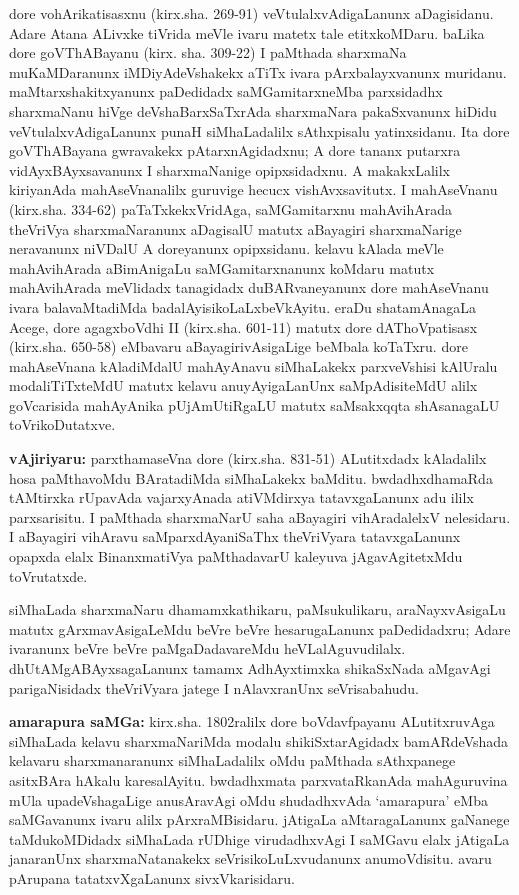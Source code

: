 dore vohArikatisasxnu (kirx.sha. 269-91) veVtulalxvAdigaLanunx aDagisidanu. Adare Atana ALivxke tiVrida meVle ivaru matetx tale etitxkoMDaru. baLika dore goVThA\-Bayanu (kirx. sha. 309-22) I paMthada sharxmaNa muKaMDaranunx iMDiyAdeVshakekx aTiTx ivara pArxbalayxvanunx muridanu. maMtarxshakitxyanunx paDedidadx saMGamitarxneMba parxsidadhx sharxmaNanu hiVge deVshaBarxSaTxrAda sharxmaNara pakaSxvanunx hiDidu veVtulalxvAdigaLanunx punaH siMhaLadalilx sAthxpisalu yatinxsidanu. Ita dore goVThABayana gwravakekx  pAtarxnAgidadxnu; A dore tananx putarxra vidAyxBAyxsavanunx I sharxmaNanige opipxsidadxnu. A makakxLalilx kiriyanAda mahAseVnanalilx guruvige hecucx vishAvxsavitutx. I mahAseVnanu (kirx.sha. 334-62) paTaTxkekxVridAga, saMGamitarxnu mahAvihArada theVriVya sharxmaNaranunx aDagisalU matutx aBayagiri sharxmaNarige neravanunx niVDalU A doreyanunx opipxsidanu. kelavu kAlada meVle mahAvihArada aBimAnigaLu saMGamitarxnanunx koMdaru matutx mahAvihArada meVlidadx tanagidadx duBARvaneyanunx dore mahAseVnanu ivara balavaMtadiMda badalAyisikoLaLxbeVkAyitu. eraDu shatamAnagaLa Acege, dore agagxboVdhi {\rm II} (kirx.sha. 601-11) matutx dore dAThoVpatisasx (kirx.sha. 650-58) eMbavaru aBayagirivAsigaLige beMbala koTaTxru. dore mahAseVnana kAladiMdalU mahAyAnavu siMhaLakekx parxveVshisi kAlUralu modaliTiTxteMdU matutx kelavu anuyAyigaLanUnx saMpAdisiteMdU alilx goVcarisida mahAyAnika pUjAmUtiRgaLU matutx saMsakxqqta shAsanagaLU toVrikoDutatxve.

{\bf vAjiriyaru:} parxthamaseVna dore (kirx.sha. 831-51) ALutitxdadx kAladalilx hosa paMthavoMdu BAratadiMda siMhaLakekx baMditu. bwdadhxdhamaRda tAMtirxka rUpavAda vajarxyAnada atiVMdirxya tatavxgaLanunx adu ililx parxsarisitu. I paMthada sharxmaNarU saha aBayagiri vihAradalelxV nelesidaru. I aBayagiri vihAravu saMparxdAyaniSaThx theVriVyara tatavxgaLanunx opapxda elalx BinanxmatiVya paMthadavarU kaleyuva jAgavAgitetxMdu toVrutatxde. 

siMhaLada sharxmaNaru dhamamxkathikaru, paMsukulikaru, araNayxvAsigaLu matutx gArxmavAsigaLeMdu beVre beVre hesarugaLanunx paDedidadxru; Adare ivaranunx beVre beVre paMgaDadavareMdu heVLalAguvudilalx. dhUtAMgABAyxsagaLanunx tamamx AdhAyxtimxka shikaSxNada aMgavAgi parigaNisidadx theVriVyara jatege I nAlavxranUnx seVrisabahudu.

{\bf amarapura saMGa:} kirx.sha. 1802ralilx dore boVdavfpayanu ALutitxruvAga siMhaLada kelavu sharxmaNariMda modalu shikiSxtarAgidadx bamARdeVshada kelavaru sharxmanaranunx siMhaLadalilx oMdu paMthada sAthxpanege asitxBAra hAkalu karesalAyitu. bwdadhxmata parxvataRkanAda mahAguruvina mUla upadeVshagaLige  anusAravAgi oMdu shudadhxvAda `amarapura' eMba saMGavanunx ivaru alilx pArxraMBisidaru. jAtigaLa aMtaragaLanunx gaNanege taMdukoMDidadx siMhaLada rUDhige virudadhxvAgi I saMGavu elalx jAtigaLa janaranUnx sharxmaNatanakekx seVrisikoLuLxvudanunx anumoVdisitu. avaru pArupana tatatxvXgaLanunx sivxVkarisidaru.

